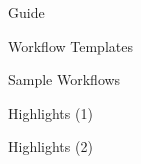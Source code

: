 \documentclass[10pt]{beamer}
\begin{document}
\begin{frame}{Guide}

\end{frame}

\begin{frame}{Workflow Templates}

\end{frame}

\begin{frame}{Sample Workflows}
    
\end{frame}

\begin{frame}{Highlights (1)}

\end{frame}

\begin{frame}{Highlights (2)}

\end{frame}
\end{document}
